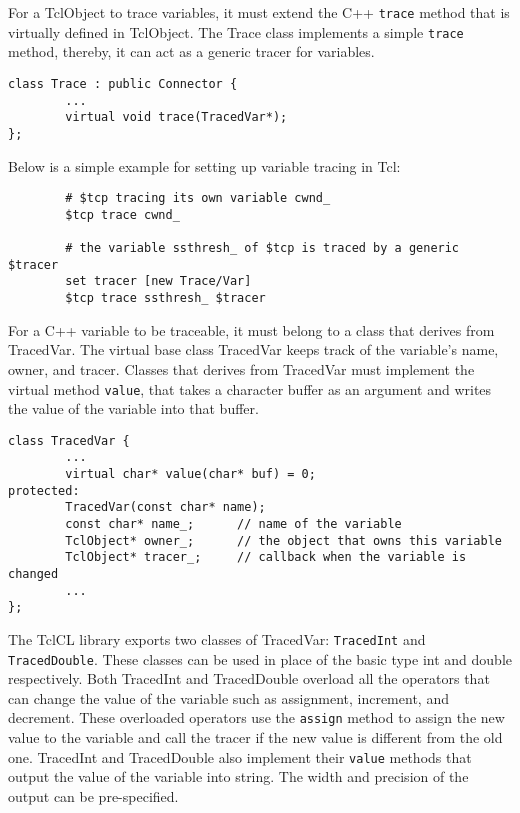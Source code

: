 For a TclObject to trace variables, it must extend the C++
{\tt trace} method that is virtually defined in TclObject.  The Trace
class implements a simple {\tt trace} method, thereby, it can act as a
generic tracer for variables.

\begin{verbatim}
class Trace : public Connector {
        ...
        virtual void trace(TracedVar*);
};
\end{verbatim}

Below is a simple example for setting up variable tracing in Tcl:

\begin{small}
\begin{verbatim}
        # $tcp tracing its own variable cwnd_
        $tcp trace cwnd_

        # the variable ssthresh_ of $tcp is traced by a generic $tracer
        set tracer [new Trace/Var]
        $tcp trace ssthresh_ $tracer
\end{verbatim}
\end{small}

For a C++ variable to be traceable, it must belong to a class that
derives from TracedVar.  The virtual base class TracedVar keeps track of
the variable's name, owner, and tracer.  Classes that derives from
TracedVar must implement the virtual method {\tt value}, that takes a
character buffer as an argument and writes the value of the variable
into that buffer.

\begin{small}
\begin{verbatim}
class TracedVar {
        ...
        virtual char* value(char* buf) = 0;
protected:
        TracedVar(const char* name);
        const char* name_;      // name of the variable
        TclObject* owner_;      // the object that owns this variable
        TclObject* tracer_;     // callback when the variable is changed
        ...
};
\end{verbatim}
\end{small}

The TclCL library exports two classes of TracedVar:  {\tt TracedInt} and
{\tt TracedDouble}.  These classes can be used in place of the basic
type int and double respectively.  Both TracedInt and TracedDouble
overload all the operators that can change the value of the variable
such as assignment, increment, and decrement.  These overloaded
operators use the {\tt assign} method to assign the new value to the
variable and call the tracer if the new value is different from the old
one.  TracedInt and TracedDouble also implement their {\tt value}
methods that output the value of the variable into string.  The width
and precision of the output can be pre-specified.

